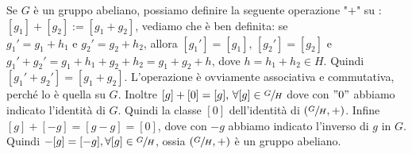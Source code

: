 \documentclass[a4paper,12pt]{article}
\theoremstyle{def}
\theoremstyle{prop}
\theoremstyle{esempio}
\theoremstyle{dimostrazione}
\theoremstyle{teo}
\theoremstyle{osservazione}
\begin{document}
Se \(G\) è un gruppo abeliano, possiamo definire la seguente operazione "\(+\)"
su : \([g_1] + [g_2] := [g_1 + g_2]\), vediamo che è ben definita:
se \(g_{1}' = g_1 + h_1 \text{ e } g_{2}' = g_2 + h_2\), allora \([g_{1}'] = [g_1]
\), \([g_{2}'] = [g_2]\) e \(g_{1}' + g_{2}' = g_1 + h_1 + g_2 + h_2 = g_1 + g_2 + h\),
dove \(h = h_1 + h_2 \in H\). Quindi \([g_{1}' + g_{2}'] = [g_1 + g_2]\).
L'operazione è ovviamente associativa e commutativa, perché lo è quella su \(G\).
Inoltre \([g] + [0] = [g] \text{, } \forall [g] \in \sfrac{G}{H}\) dove con \("0"\)
abbiamo indicato l'identità di \(G\). Quindi la classe \([0]\) dell'identità di \((\sfrac{G}{H} , +)
\).
Infine \([g] + [-g] = [g-g] = [0]\), dove con \(-g\) abbiamo indicato l'inverso di \(g\) in \(G\).
Quindi \(-[g] = [-g], \forall [g] \in \sfrac{G}{H}\), ossia \((\sfrac{G}{H},+)\) è un gruppo abeliano.
\end{document}
